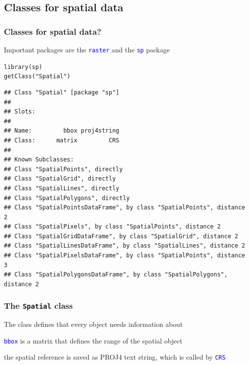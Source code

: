 \documentclass[xcolor=table, xcolor=dvipsnames]{beamer}\usepackage[]{graphicx}\usepackage[]{color}
\makeatletter
\newcommand{\hlstr}[1]{\textcolor[rgb]{0.545,0.137,0.137}{#1}}
\newcommand{\hlstd}[1]{\textcolor[rgb]{0,0,0}{#1}}
\newcommand{\hlkwd}[1]{\textcolor[rgb]{0,0,1}{#1}}
\newenvironment{kframe}{%
 \def\at@end@of@kframe{}%
 \ifinner\ifhmode%
  \def\at@end@of@kframe{\end{minipage}}%
  \begin{minipage}{\columnwidth}%
 \fi\fi%
 \def\FrameCommand##1{\hskip\@totalleftmargin \hskip-\fboxsep
 \colorbox{shadecolor}{##1}\hskip-\fboxsep
     \hskip-\linewidth \hskip-\@totalleftmargin \hskip\columnwidth}%
 \MakeFramed {\advance\hsize-\width
   \@totalleftmargin\z@ \linewidth\hsize
   \@setminipage}}%
 {\par\unskip\endMakeFramed%
 \at@end@of@kframe}
\newenvironment{knitrout}{}{} %
\newcommand{\rcode}[1]{\texttt{\textcolor{Blue}{#1}}} %
\makeatother
\begin{document}
\subsection{Classes for spatial data}

\begin{frame}[fragile]\frametitle{Classes for spatial data?}
Important packages are the \rcode{raster} and the \rcode{sp} package
\begin{knitrout}\scriptsize
{}\color{fgcolor}\begin{kframe}
\begin{alltt}
\hlkwd{library}\hlstd{(sp)}
\hlkwd{getClass}\hlstd{(}\hlstr{"Spatial"}\hlstd{)}
\end{alltt}
\begin{verbatim}
## Class "Spatial" [package "sp"]
## 
## Slots:
##                               
## Name:         bbox proj4string
## Class:      matrix         CRS
## 
## Known Subclasses: 
## Class "SpatialPoints", directly
## Class "SpatialGrid", directly
## Class "SpatialLines", directly
## Class "SpatialPolygons", directly
## Class "SpatialPointsDataFrame", by class "SpatialPoints", distance 2
## Class "SpatialPixels", by class "SpatialPoints", distance 2
## Class "SpatialGridDataFrame", by class "SpatialGrid", distance 2
## Class "SpatialLinesDataFrame", by class "SpatialLines", distance 2
## Class "SpatialPixelsDataFrame", by class "SpatialPoints", distance 3
## Class "SpatialPolygonsDataFrame", by class "SpatialPolygons", distance 2
\end{verbatim}
\end{kframe}
\end{knitrout}
\end{frame}


\begin{frame}[fragile]\frametitle{The \texttt{Spatial} class}
The class defines that every object needs information about
\pause
\begin{description}[<+->]
\item[boundary box]{\rcode{bbox} is a matrix that defines the range of the spatial object}
\item[projection]{the spatial reference is saved as PROJ4 text string, which is called by \rcode{CRS}}
\end{description}
\end{frame}
\end{document}
